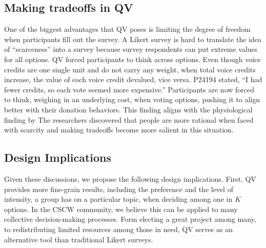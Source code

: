 \subsection{Making tradeoffs in QV}
One of the biggest advantages that QV poses is limiting the degree of freedom when participants fill out the survey.
A Likert survey is hard to translate the idea of ``scarceness'' into a survey because survey respondents can put extreme values for all options. 
QV forced participants to think across options. 
Even though voice credits are one single unit and do not carry any weight, when total voice credits increase, the value of each voice credit devalued, vice versa. P24194 stated, ``I had fewer credits, so each vote seemed more expensive.''
Participants are now forced to think, weighing in an underlying cost, when voting options, pushing it to align better with their donation behaviors.
This finding aligns with the physiological finding by \textcite{Shah2015a}
The researchers discovered that people are more rational when faced with scarcity and making tradeoffs become more salient in this situation.

\subsection{Design Implications}
Given these discussions,
we propose the following design implications.
First, QV provides more fine-grain results,
including the preference and the level of intensity,
a group has on a particular topic,
when deciding among one in $K$ options.
In the CSCW community,
we believe this can be applied to 
many collective decision-making processes.
Form electing a great project among many,
to redistributing limited resources among those in need,
QV serves as an alternative tool 
than traditional Likert surveys.

